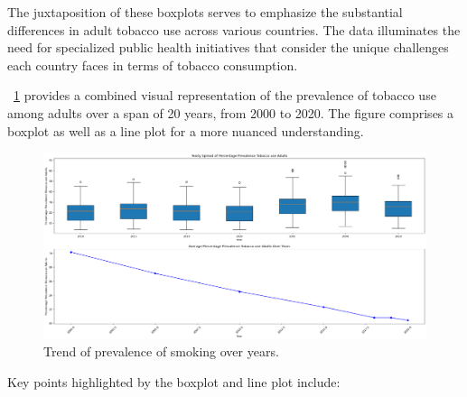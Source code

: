             The juxtaposition of these boxplots serves to emphasize the substantial differences in adult tobacco use across various countries. The data illuminates the need for specialized public health initiatives that consider the unique challenges each country faces in terms of tobacco consumption.



            \figurename~\ref{fig:du-smoking-trend-years} provides a combined visual representation of the prevalence of tobacco use among adults over a span of 20 years, from 2000 to 2020. The figure comprises a boxplot as well as a line plot for a more nuanced understanding.

            \begin{figure}[H]
                \centering
                \includegraphics[scale=0.3]{images/du_smoking_pr_sm_y_trend}
                \caption{Trend of prevalence of smoking over years.}
                \label{fig:du-smoking-trend-years}
            \end{figure}

            Key points highlighted by the boxplot and line plot include:

